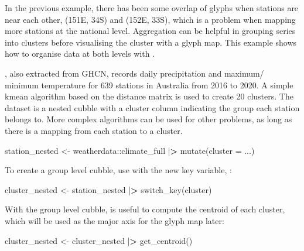 \documentclass{article}
\newenvironment{Shaded}{\begin{snugshade}}{\end{snugshade}}
\newcommand{\AttributeTok}[1]{\textcolor[rgb]{0.77,0.63,0.00}{#1}}
\newcommand{\ErrorTok}[1]{\textcolor[rgb]{0.64,0.00,0.00}{\textbf{#1}}}
\newcommand{\FunctionTok}[1]{\textcolor[rgb]{0.00,0.00,0.00}{#1}}
\newcommand{\NormalTok}[1]{#1}
\newcommand{\OtherTok}[1]{\textcolor[rgb]{0.56,0.35,0.01}{#1}}
\newcommand{\SpecialCharTok}[1]{\textcolor[rgb]{0.00,0.00,0.00}{#1}}
\begin{document}
In the previous example, there has been some overlap of glyphs when stations are near each other, (151E, 34S) and (152E, 33S), which is a problem when mapping more stations at the national level. Aggregation can be helpful in grouping series into clusters before visualising the cluster with a glyph map. This example shows how to organise data at both levels with .

, also extracted from GHCN, records daily precipitation and maximum/ minimum temperature for 639 stations in Australia from 2016 to 2020. A simple kmean algorithm based on the distance matrix is used to create 20 clusters. The dataset  is a nested cubble with a cluster column indicating the group each station belongs to. More complex algorithms can be used for other problems, as long as there is a mapping from each station to a cluster.

\begin{Shaded}
\begin{Highlighting}[]
\NormalTok{station\_nested }\OtherTok{\textless{}{-}}\NormalTok{ weatherdata}\SpecialCharTok{::}\NormalTok{climate\_full }\SpecialCharTok{|}\ErrorTok{\textgreater{}} 
  \FunctionTok{mutate}\NormalTok{(}\AttributeTok{cluster =}\NormalTok{ ...)}
\end{Highlighting}
\end{Shaded}

To create a group level cubble, use  with the new key variable, :

\begin{Shaded}
\begin{Highlighting}[]
\NormalTok{cluster\_nested }\OtherTok{\textless{}{-}}\NormalTok{ station\_nested }\SpecialCharTok{|}\ErrorTok{\textgreater{}} \FunctionTok{switch\_key}\NormalTok{(cluster) }
\end{Highlighting}
\end{Shaded}

With the group level cubble,  is useful to compute the centroid of each cluster, which will be used as the major axis for the glyph map later:

\begin{Shaded}
\begin{Highlighting}[]
\NormalTok{cluster\_nested }\OtherTok{\textless{}{-}}\NormalTok{ cluster\_nested }\SpecialCharTok{|}\ErrorTok{\textgreater{}} \FunctionTok{get\_centroid}\NormalTok{()}
\end{Highlighting}
\end{Shaded}
\end{document}
